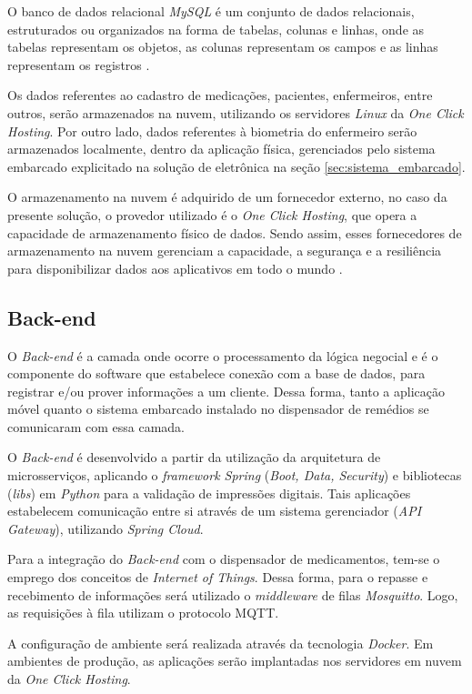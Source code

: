 O banco de dados relacional \emph{MySQL} é um conjunto de dados relacionais, estruturados ou organizados na forma de tabelas, colunas e linhas, onde as tabelas representam os objetos, as colunas representam os campos e as linhas representam os registros \cite{EDUCBA_2020}.

Os dados referentes ao cadastro de medicações, pacientes, enfermeiros, entre outros, serão armazenados na nuvem, utilizando os servidores \textit{Linux} da \textit{One Click Hosting}. Por outro lado, dados referentes à biometria do enfermeiro serão armazenados localmente, dentro da aplicação física, gerenciados pelo sistema embarcado explicitado na solução de eletrônica na seção \ref{sec:sistema_embarcado}.

O armazenamento na nuvem é adquirido de um fornecedor externo, no caso da presente solução, o provedor utilizado é o \textit{One Click Hosting}, que opera a capacidade de armazenamento físico de dados. Sendo assim, esses fornecedores de armazenamento na nuvem gerenciam a capacidade, a segurança e a resiliência para disponibilizar dados aos aplicativos em todo o mundo \cite{AMAZONWEBSERVICES_2020}.

\subsection{Back-end}\label{sec:software_backend}
O \emph{Back-end} é a camada onde ocorre o processamento da lógica negocial e é o componente do software que estabelece conexão com a base de dados, para registrar e/ou prover informações a um cliente. Dessa forma, tanto a aplicação móvel quanto o sistema embarcado instalado no dispensador de remédios se comunicaram com essa camada.

O \emph{Back-end} é desenvolvido a partir da utilização da arquitetura de microsserviços, aplicando o \emph{framework Spring} (\emph{Boot, Data, Security}) e bibliotecas (\emph{libs}) em \textit{Python} para a validação de impressões digitais. Tais aplicações estabelecem comunicação entre si através de um sistema gerenciador (\emph{API Gateway}), utilizando \textit{Spring Cloud}.

Para a integração do \textit{Back-end} com o dispensador de medicamentos, tem-se o emprego dos conceitos de \emph{Internet of Things}. Dessa forma, para o repasse e recebimento de informações será utilizado o \emph{middleware} de filas \textit{Mosquitto}. Logo, as requisições à fila utilizam o protocolo MQTT.

A configuração de ambiente será realizada através da tecnologia \textit{Docker}. Em ambientes de produção, as aplicações serão implantadas nos servidores em nuvem da \textit{One Click Hosting}.

